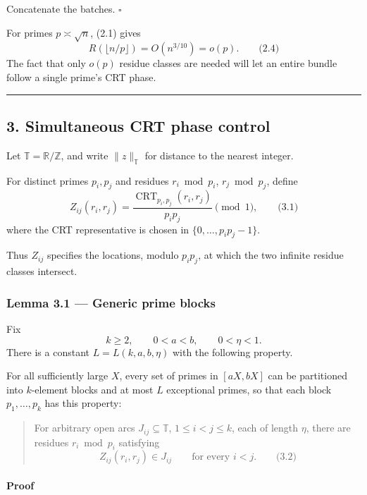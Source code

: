 \documentclass[
  11pt,
  a4paper,
]{article}
\begin{document}
Concatenate the batches. \(\square\)

For primes \(p\asymp\sqrt n\), (2.1) gives \[
R(\lfloor n/p\rfloor)=O(n^{3/10})=o(p).
\qquad\text{(2.4)}
\] The fact that only \(o(p)\) residue classes are needed will let an
entire bundle follow a single prime's CRT phase.

\begin{center}\rule{0.5\linewidth}{0.5pt}\end{center}

\subsection{3. Simultaneous CRT phase
control}\label{simultaneous-crt-phase-control}

Let \(\mathbb T=\mathbb R/\mathbb Z\), and write \(\|z\|_{\mathbb T}\)
for distance to the nearest integer.

For distinct primes \(p_i,p_j\) and residues \(r_i\bmod p_i\),
\(r_j\bmod p_j\), define \[
Z_{ij}(r_i,r_j)
=
\frac{\operatorname{CRT}_{p_i,p_j}(r_i,r_j)}{p_ip_j}
\pmod1,
\qquad\text{(3.1)}
\] where the CRT representative is chosen in \(\{0,\ldots,p_ip_j-1\}\).

Thus \(Z_{ij}\) specifies the locations, modulo \(p_ip_j\), at which the
two infinite residue classes intersect.

\subsubsection{Lemma 3.1 --- Generic prime
blocks}\label{lemma-3.1-generic-prime-blocks}

Fix \[
k\ge2,\qquad 0<a<b,\qquad 0<\eta<1.
\] There is a constant \(L=L(k,a,b,\eta)\) with the following property.

For all sufficiently large \(X\), every set of primes in \([aX,bX]\) can
be partitioned into \(k\)-element blocks and at most \(L\) exceptional
primes, so that each block \(p_1,\ldots,p_k\) has this property:

\begin{quote}
For arbitrary open arcs \(J_{ij}\subseteq\mathbb T\), \(1\le i<j\le k\),
each of length \(\eta\), there are residues \(r_i\bmod p_i\) satisfying
\[
Z_{ij}(r_i,r_j)\in J_{ij}
\qquad\text{for every }i<j.
\qquad\text{(3.2)}
\]
\end{quote}

\paragraph{Proof}\label{proof-2}
\end{document}
